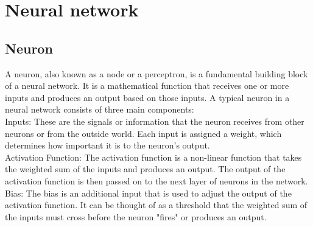 \documentclass[a4paper]{sapthesis}
\begin{document}
\section {Neural network}
\subsection{Neuron}\label{sec:neuron}
A neuron, also known as a node or a perceptron, is a fundamental building
 block of a neural network. It is a mathematical function that receives one
or more inputs and produces an output based on those inputs. \newline 
A typical neuron in a neural network consists of three main components:\newline \\
Inputs: These are the signals or information that the neuron receives from 
other neurons or from the outside world.
 Each input is assigned a weight, which determines how important it is 
 to the neuron's output. \newline \\
Activation Function: The activation function is a non-linear function 
that takes the weighted sum of the inputs and produces an output. 
The output of the activation function is then passed on to the next 
layer of neurons in the network.\newline \\
Bias: The bias is an additional input that is used to adjust the output 
of the activation function. It can be thought of as a threshold that the 
weighted sum of the inputs must cross before the neuron "fires" or 
produces an output.
\end{document}
